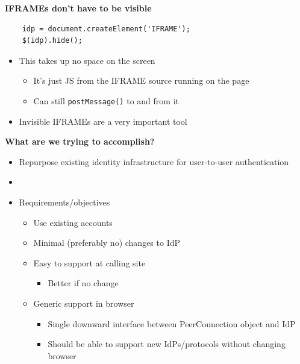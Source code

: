 \documentclass[helvetica]{seminar}
\newcommand{\heading}[1]{%
  \begin{center} 
    \large\bf 
    #1 
  \end{center} 
  \vspace{.4 in}}
\begin{document}
\begin{slide}
\heading{IFRAMEs don't have to be visible}

\begin{verbatim}
	idp = document.createElement('IFRAME');
	$(idp).hide();

\end{verbatim}

\begin{itemize}
\item This takes up no space on the screen
\begin{itemize}
\item It's just JS from the IFRAME source running on the page
\item Can still \verb^postMessage()^ to and from it
\end{itemize}
\item Invisible IFRAMEs are a very important tool
\end{itemize}
\end{slide}



\begin{slide}
\heading{What are we trying to accomplish?}

\vspace{-.3in}
\begin{itemize}
\item Repurpose existing identity infrastructure for user-to-user authentication
\item []
\item Requirements/objectives
  \begin{itemize}
  \item Use existing accounts
  \item Minimal (preferably no) changes to IdP
  \item Easy to support at calling site
    \begin{itemize}
    \item Better if no change
    \end{itemize}

  \item Generic support in browser
    \begin{itemize}
    \item Single downward interface between PeerConnection object and IdP
    \item Should be able to support new IdPs/protocols without changing browser
    \end{itemize}
  \end{itemize}

\end{itemize}

\end{slide}
\end{document}
